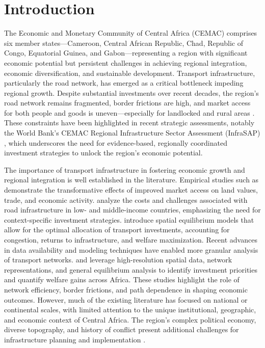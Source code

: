 \documentclass[a4paper]{article}
\begin{document}
\newpage
\section{Introduction}

The Economic and Monetary Community of Central Africa (CEMAC) comprises six member states—Cameroon, Central African Republic, Chad, Republic of Congo, Equatorial Guinea, and Gabon—representing a region with significant economic potential but persistent challenges in achieving regional integration, economic diversification, and sustainable development. Transport infrastructure, particularly the road network, has emerged as a critical bottleneck impeding regional growth. Despite substantial investments over recent decades, the region’s road network remains fragmented, border frictions are high, and market access for both people and goods is uneven—especially for landlocked and rural areas \citep{LPI2023,WorldBank2025_CEMAC_InfrastructureSAP}. These constraints have been highlighted in recent strategic assessments, notably the World Bank's CEMAC Regional Infrastructure Sector Assessment (InfraSAP) \citep{WorldBank2025_CEMAC_InfrastructureSAP}, which underscores the need for evidence-based, regionally coordinated investment strategies to unlock the region’s economic potential. \newline 

The importance of transport infrastructure in fostering economic growth and regional integration is well established in the literature. %
Empirical studies such as \citet{donaldson2016railroads} demonstrate the transformative effects of improved market access on land values, trade, and economic activity. \citet{collier2016cost} analyze the costs and challenges associated with road infrastructure in low- and middle-income countries, emphasizing the need for context-specific investment strategies. \citet{fajgelbaum2020optimal} introduce spatial equilibrium models that allow for the optimal allocation of transport investments, accounting for congestion, returns to infrastructure, and welfare maximization.
Recent advances in data availability and modeling techniques have enabled more granular analysis of transport networks. \citet{graff2024spatial} and \citet{krantz2024optimal} leverage high-resolution spatial data, network representations, and general equilibrium analysis to identify investment priorities and quantify welfare gains across Africa. These studies highlight the role of network efficiency, border frictions, and path dependence in shaping economic outcomes. However, much of the existing literature has focused on national or continental scales, with limited attention to the unique institutional, geographic, and economic context of Central Africa. The region’s complex political economy, diverse topography, and history of conflict present additional challenges for infrastructure planning and implementation \citep{raleigh2023political,AfDB2022_AfricanEconomicOutlook}. \newline 
\end{document}
